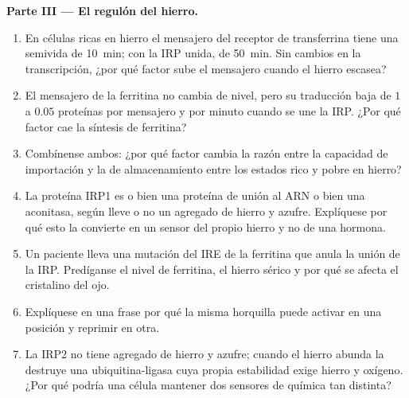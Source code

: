 \begin{problem}
\medskip
\noindent\textbf{Parte III --- El regulón del hierro.}
\begin{enumerate}[resume]
  \item En células ricas en hierro el mensajero del receptor de
        transferrina tiene una semivida de \qty{10}{min}; con la IRP
        unida, de \qty{50}{min}. Sin cambios en la transcripción, ¿por
        qué factor sube el mensajero cuando el hierro escasea?
  \item El mensajero de la ferritina no cambia de nivel, pero su
        traducción baja de $1$ a $0.05$ proteínas por mensajero y por
        minuto cuando se une la IRP. ¿Por qué factor cae la síntesis de
        ferritina?
  \item Combínense ambos: ¿por qué factor cambia la razón entre la
        capacidad de importación y la de almacenamiento entre los
        estados rico y pobre en hierro?
  \item La proteína IRP1 es o bien una proteína de unión al ARN o bien
        una aconitasa, según lleve o no un agregado de hierro y azufre.
        Explíquese por qué esto la convierte en un sensor del propio
        hierro y no de una hormona.
  \item Un paciente lleva una mutación del IRE de la ferritina que
        anula la unión de la IRP. Predíganse el nivel de ferritina, el
        hierro sérico y por qué se afecta el cristalino del ojo.
  \item Explíquese en una frase por qué la misma horquilla puede activar
        en una posición y reprimir en otra.
  \item La IRP2 no tiene agregado de hierro y azufre; cuando el hierro
        abunda la destruye una ubiquitina-ligasa cuya propia estabilidad
        exige hierro y oxígeno. ¿Por qué podría una célula mantener dos
        sensores de química tan distinta?
\end{enumerate}


\end{problem}
